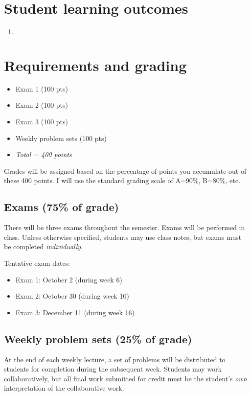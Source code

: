 \documentclass[10pt]{article}
\begin{document}
\section*{Student learning outcomes}
\label{sec-4}

\begin{enumerate}
\item 
\end{enumerate}

\section*{Requirements and grading}
\label{sec-5}

\begin{itemize}
\item Exam 1 (100 pts)
\item Exam 2 (100 pts)
\item Exam 3 (100 pts)
\item Weekly problem sets (100 pts)
\item \emph{Total = 400 points}
\end{itemize}

Grades will be assigned based on the percentage of points you accumulate out of these 400 points.  I will use the standard grading scale of A=90\%, B=80\%, etc.

\subsection*{Exams (75\% of grade)}
\label{sec-5-1}
There will be three exams throughout the semester.  Exams will be performed in class.  Unless otherwise specified, students may use class notes, but exams must be completed \emph{individually}.  

Tentative exam dates:

\begin{itemize}
\item Exam 1: October 2 (during week 6)
\item Exam 2: October 30 (during week 10)
\item Exam 3: December 11 (during week 16)
\end{itemize}

\subsection*{Weekly problem sets (25\% of grade)}
\label{sec-5-2}
At the end of each weekly lecture, a set of problems will be distributed to students for completion during the subsequent week.  Students may work collaboratively, but all final work submitted for credit must be the student's \emph{own} interpretation of the collaborative work.
\end{document}
